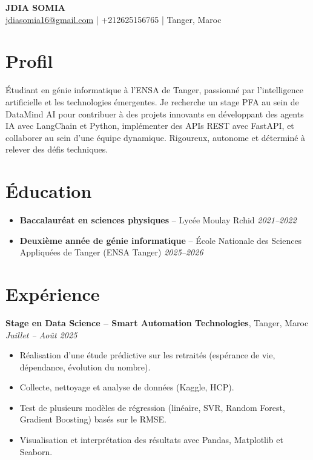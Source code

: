 \documentclass[a4paper,11pt]{article}
\begin{document}
\begin{center}
    {\Huge \textbf{JDIA SOMIA}} \\[6pt]
    \href{mailto:jdiasomia16@gmail.com}{jdiasomia16@gmail.com} \quad|\quad
    +212625156765 \quad|\quad
    Tanger, Maroc
\end{center}

\vspace{6pt}

\section*{Profil}
Étudiant en génie informatique à l'ENSA de Tanger, passionné par l'intelligence artificielle et les technologies émergentes. Je recherche un stage PFA au sein de DataMind AI pour contribuer à des projets innovants en développant des agents IA avec LangChain et Python, implémenter des APIs REST avec FastAPI, et collaborer au sein d'une équipe dynamique. Rigoureux, autonome et déterminé à relever des défis techniques.

\section*{Éducation}
\begin{itemize}[leftmargin=*, noitemsep]
    \item \textbf{Baccalauréat en sciences physiques} – Lycée Moulay Rchid \hfill \textit{2021–2022}
    \item \textbf{Deuxième année de génie informatique} – École Nationale des Sciences Appliquées de Tanger (ENSA Tanger) \hfill \textit{2025–2026}
\end{itemize}

\section*{Expérience}

\textbf{Stage en Data Science – Smart Automation Technologies}, Tanger, Maroc \hfill \textit{Juillet – Août 2025}
\begin{itemize}[leftmargin=*, noitemsep]
    \item Réalisation d'une étude prédictive sur les retraités (espérance de vie, dépendance, évolution du nombre).
    \item Collecte, nettoyage et analyse de données (Kaggle, HCP).
    \item Test de plusieurs modèles de régression (linéaire, SVR, Random Forest, Gradient Boosting) basés sur le RMSE.
    \item Visualisation et interprétation des résultats avec Pandas, Matplotlib et Seaborn.
\end{itemize}
\end{document}
